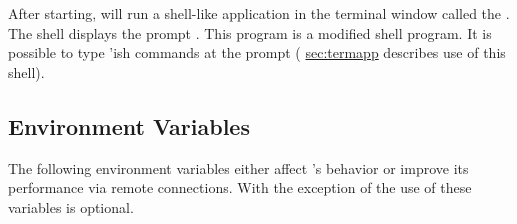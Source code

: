 After starting, \sr{} will run a shell-like application in the
terminal window called the .  The \sr{} shell displays the
prompt .  This program is  a modified  shell program. It is possible to type
'ish \sr{} commands at the prompt ( \hyperref{a later section}{Section~}{}{sec:termapp} describes use of this shell).


\subsection{Environment Variables}
\label{sec:environ} 

\newcommand{\envitem}[1]{\item[\envvar{#1}]\latex{\mbox{}\\}}

The following environment variables either affect \sr{}'s behavior or
improve its performance via remote connections.  With the exception of
 the use of these variables is
optional.

